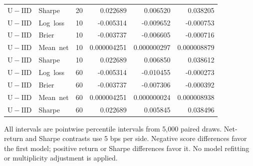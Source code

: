 \begin{longtable}{llrrrr}
\mbox{$\mathrm{U}-\mathrm{IID}$} & \mbox{Sharpe} & 20 & 0.022689 & 0.006520 & 0.038205\\
\mbox{$\mathrm{U}-\mathrm{IID}$} & \mbox{Log loss} & 10 & -0.005314 & -0.009652 & -0.000753\\
\mbox{$\mathrm{U}-\mathrm{IID}$} & \mbox{Brier} & 10 & -0.003737 & -0.006605 & -0.000716\\
\mbox{$\mathrm{U}-\mathrm{IID}$} & \mbox{Mean net} & 10 & 0.000004251 & 0.000000297 & 0.000008879\\
\mbox{$\mathrm{U}-\mathrm{IID}$} & \mbox{Sharpe} & 10 & 0.022689 & 0.006850 & 0.038612\\
\mbox{$\mathrm{U}-\mathrm{IID}$} & \mbox{Log loss} & 60 & -0.005314 & -0.010455 & -0.000273\\
\mbox{$\mathrm{U}-\mathrm{IID}$} & \mbox{Brier} & 60 & -0.003737 & -0.007306 & -0.000392\\
\mbox{$\mathrm{U}-\mathrm{IID}$} & \mbox{Mean net} & 60 & 0.000004251 & 0.000000024 & 0.000008938\\
\mbox{$\mathrm{U}-\mathrm{IID}$} & \mbox{Sharpe} & 60 & 0.022689 & 0.005845 & 0.038496\\
\bottomrule\end{longtable}\endgroup
All intervals are pointwise percentile intervals from 5,000 paired draws. Net-return and Sharpe contrasts use 5 bps per side. Negative score differences favor the first model; positive return or Sharpe differences favor it. No model refitting or multiplicity adjustment is applied.

\clearpage
